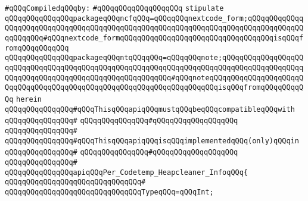 \newline
\verb|#qQQqCompiledqQQqby:|\newline
\verb|#qQQqqQQqqQQqqQQqqQQq|\newline
\newline
\verb|stipulate|\newline
\verb|qQQqqQQqqQQqqQQqpackageqQQqncfqQQq=qQQqqQQqnextcode_form;qQQqqQQqqQQqqQQqqQQqqQQqqQQqqQQqqQQqqQQqqQQqqQQqqQQqqQQqqQQqqQQqqQQqqQQqqQQqqQQqqQQqqQQqqQQq#qQQqnextcode_formqQQqqQQqqQQqqQQqqQQqqQQqqQQqqQQqqQQqisqQQqfromqQQqqQQqqQQq|\newline
\verb|qQQqqQQqqQQqqQQqpackageqQQqntqQQqqQQq=qQQqqQQqnote;qQQqqQQqqQQqqQQqqQQqqQQqqQQqqQQqqQQqqQQqqQQqqQQqqQQqqQQqqQQqqQQqqQQqqQQqqQQqqQQqqQQqqQQqqQQqqQQqqQQqqQQqqQQqqQQqqQQqqQQqqQQqqQQq#qQQqnoteqQQqqQQqqQQqqQQqqQQqqQQqqQQqqQQqqQQqqQQqqQQqqQQqqQQqqQQqqQQqqQQqqQQqqQQqisqQQqfromqQQqqQQqqQQq|\newline
\verb|herein|\newline
\newline
\verb|qQQqqQQqqQQqqQQq#qQQqThisqQQqapiqQQqmustqQQqbeqQQqcompatibleqQQqwith|\newline
\verb|qQQqqQQqqQQqqQQq#|\newline
\verb|qQQqqQQqqQQqqQQq#qQQqqQQqqQQqqQQqqQQq|\newline
\verb|qQQqqQQqqQQqqQQq#|\newline
\verb|qQQqqQQqqQQqqQQq#qQQqThisqQQqapiqQQqisqQQqimplementedqQQq(only)qQQqin|\newline
\verb|qQQqqQQqqQQqqQQq#|\newline
\verb|qQQqqQQqqQQqqQQq#qQQqqQQqqQQqqQQqqQQq|\newline
\verb|qQQqqQQqqQQqqQQq#|\newline
\verb|qQQqqQQqqQQqqQQqapiqQQqPer_Codetemp_Heapcleaner_InfoqQQq{|\newline
\verb|qQQqqQQqqQQqqQQqqQQqqQQqqQQqqQQq#|\newline
\verb|qQQqqQQqqQQqqQQqqQQqqQQqqQQqqQQqTypeqQQq=qQQqInt;|\newline
